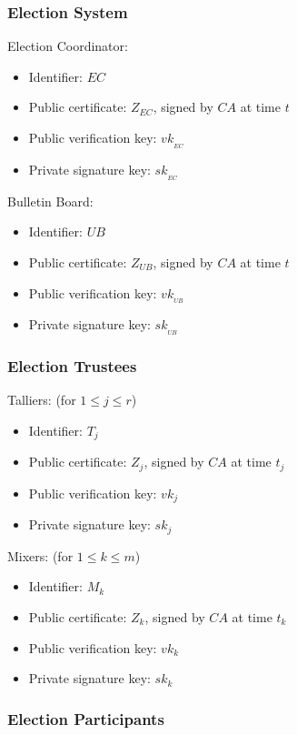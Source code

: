 \documentclass[bibtotoc,halfparskip,oneside]{scrreprt}
\newcommand{\sk}[1]{\mathit{sk}_{#1}\xspace}
\newcommand{\vk}[1]{\mathit{vk}_{#1}\xspace}
\newcommand{\SK}[1]{\sk{_#1}\xspace}
\newcommand{\VK}[1]{\vk{_#1}\xspace}
\newcommand{\CA}{\ensuremath{\mathit{CA}}\xspace}
\newcommand{\EC}{\ensuremath{\mathit{EC}}\xspace}
\newcommand{\UB}{\ensuremath{\mathit{UB}}\xspace}
\newcommand{\Tallier}[1]{\ensuremath{\mathit{T}_{#1}}\xspace}
\newcommand{\Mixer}[1]{\ensuremath{\mathit{M}_{#1}}\xspace}
\begin{document}
\subsubsection{Election System}

Election Coordinator:
\begin{itemize}
	\item Identifier: \EC
	\item Public certificate: $Z_{\EC}$, signed by \CA at time $t$
	\item Public verification key: $\VK{\EC}$ 
	\item Private signature key: $\SK{\EC}$
\end{itemize}

Bulletin Board:
\begin{itemize}
	\item Identifier: \UB
	\item Public certificate: $Z_{\UB}$, signed by \CA at time $t$
	\item Public verification key: $\VK{\UB}$ 
	\item Private signature key: $\SK{\UB}$
\end{itemize}

\subsubsection{Election Trustees}

Talliers: (for $1\leq j\leq r$)
\begin{itemize}
	\item Identifier: $\Tallier{j}$
	\item Public certificate: $Z_{j}$, signed by \CA at time $t_j$
	\item Public verification key: $\vk{j}$ 
	\item Private signature key: $\sk{j}$
\end{itemize}

Mixers: (for $1\leq k\leq m$)
\begin{itemize}
	\item Identifier: $\Mixer{k}$
	\item Public certificate: $Z_{k}$, signed by \CA at time $t_k$
	\item Public verification key: $\vk{k}$ 
	\item Private signature key: $\sk{k}$
\end{itemize}

\subsubsection{Election Participants}
\end{document}
